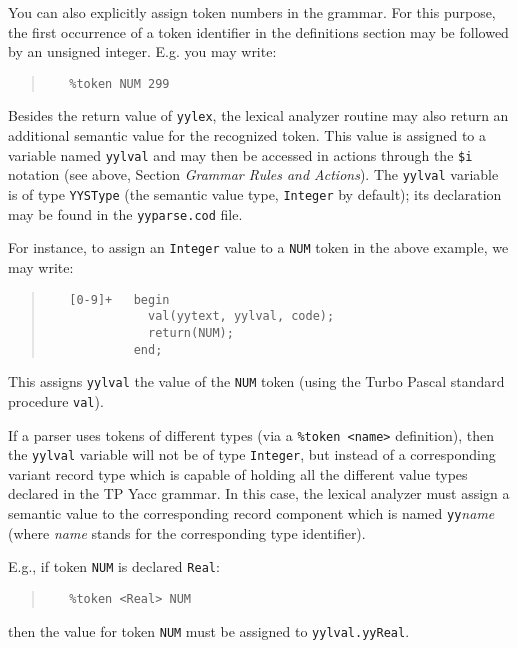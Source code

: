 You can also explicitly assign token numbers in the grammar. For this
purpose, the first occurrence of a token identifier in the definitions
section may be followed by an unsigned integer. E.g. you may write:
\begin{quote}\begin{verbatim}
   %token NUM 299
\end{verbatim}\end{quote}

Besides the return value of \verb"yylex", the lexical analyzer routine may
also return an additional semantic value for the recognized token. This value
is assigned to a variable named \verb"yylval" and may then be accessed in
actions through the \verb"$i" notation (see above, Section {\em Grammar
Rules and Actions\/}). The \verb"yylval" variable is of type \verb"YYSType"
(the semantic value type, \verb"Integer" by default); its declaration may be
found in the \verb"yyparse.cod" file.

For instance, to assign an \verb"Integer" value to a \verb"NUM" token in the
above example, we may write:

\begin{quote}\begin{verbatim}
   [0-9]+   begin
              val(yytext, yylval, code);
              return(NUM);
            end;
\end{verbatim}\end{quote}

This assigns \verb"yylval" the value of the \verb"NUM" token (using the Turbo
Pascal standard procedure \verb"val").

If a parser uses tokens of different types (via a \verb"%token <name>"
definition), then the \verb"yylval" variable will not be of type
\verb"Integer", but instead of a corresponding variant record type which is
capable of holding all the different value types declared in the TP Yacc
grammar. In this case, the lexical analyzer must assign a semantic value to
the corresponding record component which is named \verb"yy"{\em name\/}
(where {\em name\/} stands for the corresponding type identifier).

E.g., if token \verb"NUM" is declared \verb"Real":
\begin{quote}\begin{verbatim}
   %token <Real> NUM
\end{verbatim}\end{quote}
then the value for token \verb"NUM" must be assigned to \verb"yylval.yyReal".

